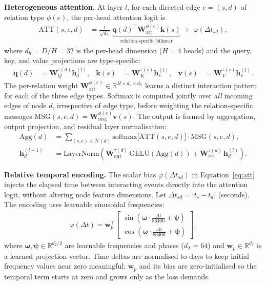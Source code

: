 \textbf{Heterogeneous attention.}
At layer $l$, for each directed edge $e = (s, d)$ of relation type $\phi(e)$,
the per-head attention logit is
\begin{align}
  \mathrm{ATT}(s, e, d)
  &= \frac{1}{\sqrt{d_h}}
     \;\underbrace{
       \mathbf{q}(d)^{\!\top}
       \mathbf{W}_{\mathrm{att}}^{\phi(e)}
       \mathbf{k}(s)
     }_{\text{relation-specific bilinear}}
     \;+\; \varphi(\Delta t_{sd}),
  \label{eq:att}
\end{align}
where $d_h = D / H = 32$ is the per-head dimension ($H = 4$ heads) and the
query, key, and value projections are type-specific:
\begin{align}
  \mathbf{q}(d) &= \mathbf{W}_Q^{\tau(d)} \mathbf{h}_d^{(l)}, &
  \mathbf{k}(s) &= \mathbf{W}_K^{\tau(s)} \mathbf{h}_s^{(l)}, &
  \mathbf{v}(s) &= \mathbf{W}_V^{\tau(s)} \mathbf{h}_s^{(l)}.
  \label{eq:qkv}
\end{align}
The per-relation weight $\mathbf{W}_{\mathrm{att}}^{\phi(e)} \in
\mathbb{R}^{H \times d_h \times d_h}$ learns a distinct interaction pattern
for each of the three edge types.
Softmax is computed jointly over \emph{all} incoming edges of node $d$,
irrespective of edge type, before weighting the relation-specific messages
$\mathrm{MSG}(s, e, d) = \mathbf{W}_{\mathrm{msg}}^{\phi(e)} \mathbf{v}(s)$.
The output is formed by aggregation, output projection, and residual layer
normalisation:
\begin{align}
  \mathrm{Agg}(d)
  &= \sum_{(s,e) \in \mathcal{N}(d)}
     \mathrm{softmax}\!\bigl[\mathrm{ATT}(s, e, d)\bigr]
     \cdot \mathrm{MSG}(s, e, d),
  \label{eq:agg} \\
  \mathbf{h}_d^{(l+1)}
  &= \mathrm{LayerNorm}\!\left(
       \mathbf{W}_{\mathrm{out}}^{\tau(d)}\,
       \mathrm{GELU}\!\left(\mathrm{Agg}(d)\right)
       + \mathbf{W}_{\mathrm{res}}^{\tau(d)}\,
       \mathbf{h}_d^{(l)}
     \right).
  \label{eq:update}
\end{align}

\textbf{Relative temporal encoding.}
The scalar bias $\varphi(\Delta t_{sd})$ in Equation~\eqref{eq:att} injects the
elapsed time between interacting events directly into the attention logit,
without altering node feature dimensions.
Let $\Delta t_{sd} = |t_s - t_d|$ (seconds).
The encoding uses learnable sinusoidal frequencies:
\begin{align}
  \varphi(\Delta t)
  = \mathbf{w}_p^{\!\top}
    \begin{bmatrix}
      \sin\!\left(\boldsymbol{\omega} \cdot \tfrac{\Delta t}{86400}
                  + \boldsymbol{\psi}\right) \\[2pt]
      \cos\!\left(\boldsymbol{\omega} \cdot \tfrac{\Delta t}{86400}
                  + \boldsymbol{\psi}\right)
    \end{bmatrix},
  \label{eq:temporal}
\end{align}
where $\boldsymbol{\omega}, \boldsymbol{\psi} \in \mathbb{R}^{d_T/2}$ are
learnable frequencies and phases ($d_T = 64$) and $\mathbf{w}_p \in
\mathbb{R}^{d_T}$ is a learned projection vector.
Time deltas are normalised to days to keep initial frequency values near zero
meaningful; $\mathbf{w}_p$ and its bias are zero-initialised so the temporal
term starts at zero and grows only as the loss demands.

